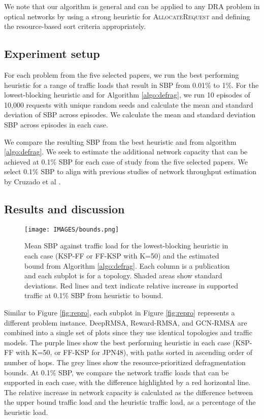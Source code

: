 We note that our algorithm is general and can be applied to any DRA problem in optical networks by using a strong heuristic for \textsc{AllocateRequest} and defining the resource-based sort criteria appropriately.






\subsection{Experiment setup}

For each problem from the five selected papers, we run the best performing heuristic for a range of traffic loads that result in SBP from 0.01\% to 1\%. For the lowest-blocking heuristic and for Algorithm \ref{algo:defrag}, we run 10 episodes of 10,000 requests with unique random seeds and calculate the mean and standard deviation of SBP across episodes. We calculate the mean and standard deviation SBP across episodes in each case. 

We compare the resulting SBP from the best heuristic and from algorithm \ref{algo:defrag}. We seek to estimate the additional network capacity that can be achieved at 0.1\% SBP for each case of study from the five selected papers. We select 0.1\% SBP to align with previous studies of network throughput estimation by Cruzado et al \cite{cruzado_effective_2023,cruzado_capacity-bound_2024}.

\subsection{Results and discussion}


\begin{figure*}[ht]
  \texttt{[image: IMAGES/bounds.png]}
  \caption{Mean SBP against traffic load for the lowest-blocking heuristic in each case (KSP-FF or FF-KSP with K=50) and the estimated bound from Algorithm \ref{algo:defrag}. Each column is a publication and each subplot is for a topology. Shaded areas show standard deviations. Red lines and text indicate relative increase in supported traffic at 0.1\% SBP from heuristic to bound.}
  \label{fig:bounds}
\end{figure*}


Similar to Figure \ref{fig:repro}, each subplot in Figure \ref{fig:repro} represents a different problem instance. DeepRMSA, Reward-RMSA, and GCN-RMSA are combined into a single set of plots since they use identical topologies and traffic models. The purple lines show the best performing heuristic in each case (KSP-FF with K=50, or FF-KSP for JPN48), with paths sorted in ascending order of number of hops. The grey lines show the resource-prioritized defragmentation bounds. At 0.1\% SBP, we compare the network traffic loads that can be supported in each case, with the difference highlighted by a red horizontal line. The relative increase in network capacity is calculated as the difference between the upper bound traffic load and the heuristic traffic load, as a percentage of the heuristic load.

